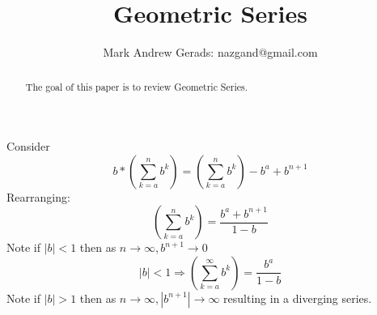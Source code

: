 \documentclass[]{article}
\author{Mark Andrew Gerads: nazgand@gmail.com}
\title{Geometric Series}
\newcommand{\pqty}[1]{{\left(#1\right)}}
\newcommand{\abs}[1]{{\left\lvert#1\right\rvert}}
\numberwithin{equation}{section}
\begin{document}
	
	\maketitle
	
	\begin{abstract}
		The goal of this paper is to review Geometric Series.
	\end{abstract}
	
	Consider
	\begin{equation}
		b*\pqty{\sum_{k=a}^{n} b^k}
		=\pqty{\sum_{k=a}^{n} b^k}-b^a+b^{n+1}
	\end{equation}
	Rearranging:
	\begin{equation}
	\pqty{\sum_{k=a}^{n} b^k}
	=\frac{b^a+b^{n+1}}{1-b}
	\end{equation}
	Note if \(\abs{b}<1\) then as \(n\to\infty, b^{n+1}\to 0\)
	\begin{equation}
	\label{GeometricSeries}
	\abs{b}<1\Rightarrow
	\pqty{\sum_{k=a}^{\infty} b^k}
	=\frac{b^a}{1-b}
	\end{equation}
	Note if \(\abs{b}>1\) then as \(n\to\infty, \abs{b^{n+1}}\to \infty\) resulting in a diverging series.
\end{document}
